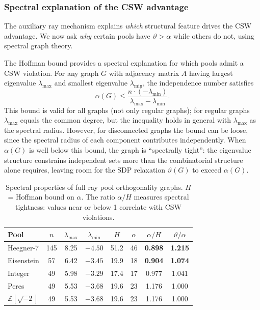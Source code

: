 \documentclass[12pt,a4paper]{article}
\newcommand{\Z}{\mathbb{Z}}
\begin{document}
\subsubsection{Spectral explanation of the CSW advantage}\label{sec:spectral}

The auxiliary ray mechanism explains \emph{which} structural feature drives the CSW advantage. We now ask \emph{why} certain pools have $\vartheta > \alpha$ while others do not, using spectral graph theory.

The Hoffman bound provides a spectral explanation for which pools admit a CSW violation. For any graph $G$ with adjacency matrix $A$ having largest eigenvalue $\lambda_{\max}$ and smallest eigenvalue $\lambda_{\min}$, the independence number satisfies~\cite{Haemers1995}
\[
\alpha(G) \leq \frac{n \cdot (-\lambda_{\min})}{\lambda_{\max} - \lambda_{\min}}.
\]
This bound is valid for all graphs (not only regular graphs); for regular graphs $\lambda_{\max}$ equals the common degree, but the inequality holds in general with $\lambda_{\max}$ as the spectral radius. However, for disconnected graphs the bound can be loose, since the spectral radius of each component contributes independently. When $\alpha(G)$ is well below this bound, the graph is ``spectrally tight'': the eigenvalue structure constrains independent sets more than the combinatorial structure alone requires, leaving room for the SDP relaxation $\vartheta(G)$ to exceed $\alpha(G)$.

\begin{table}[ht]
\centering
\caption{Spectral properties of full ray pool orthogonality graphs. $H$ = Hoffman bound on $\alpha$. The ratio $\alpha/H$ measures spectral tightness: values near or below 1 correlate with CSW violations.}
\label{tab:spectral}
\begin{tabular}{lccccccc}
\toprule
Pool & $n$ & $\lambda_{\max}$ & $\lambda_{\min}$ & $H$ & $\alpha$ & $\alpha/H$ & $\vartheta/\alpha$ \\
\midrule
Heegner-7 & 145 & 8.25 & $-4.50$ & 51.2 & 46 & \textbf{0.898} & \textbf{1.215} \\
Eisenstein & 57 & 6.42 & $-3.45$ & 19.9 & 18 & \textbf{0.904} & \textbf{1.074} \\
Integer & 49 & 5.98 & $-3.29$ & 17.4 & 17 & 0.977 & 1.041 \\
Peres & 49 & 5.53 & $-3.68$ & 19.6 & 23 & 1.176 & 1.000 \\
$\Z[\sqrt{-2}]$ & 49 & 5.53 & $-3.68$ & 19.6 & 23 & 1.176 & 1.000 \\
\bottomrule
\end{tabular}
\end{table}
\end{document}
